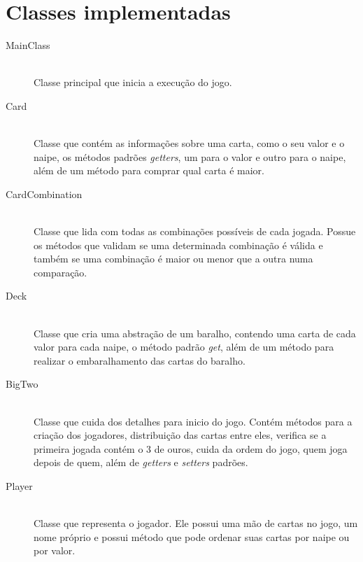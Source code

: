 \documentclass[12pt]{article}
\begin{document}
\section{Classes implementadas}
\label{classesimplementadas}
\vspace{0.4 true cm}
\begin{description}

\item[MainClass] \hfill \\
Classe principal que inicia a execução do jogo.
\vspace{0.4 true cm}

\item[Card] \hfill \\
Classe que contém as informações sobre uma carta, como o seu valor e o naipe, os métodos padrões \textit{getters}, um para o valor e outro para o naipe, além de um método para comprar qual carta é maior.
\vspace{0.4 true cm}

\item[CardCombination] \hfill \\
Classe que lida com todas as combinações possíveis de cada jogada. Possue os métodos que validam se uma determinada combinação é válida e também se uma combinação é maior ou menor que a outra numa comparação.
\vspace{0.4 true cm}

\item[Deck] \hfill \\
Classe que cria uma abstração de um baralho, contendo uma carta de cada valor para cada naipe, o método padrão \textit{get}, além de um método para realizar o embaralhamento das cartas do baralho.
\vspace{0.4 true cm}

\item[BigTwo] \hfill \\
Classe que cuida dos detalhes para inicio do jogo. Contém métodos para a criação dos jogadores, distribuição das cartas entre eles, verifica se a primeira jogada contém o 3 de ouros, cuida da ordem do jogo, quem joga depois de quem, além de \textit{getters} e \textit{setters} padrões.
\vspace{0.4 true cm}

\item[Player] \hfill \\
Classe que representa o jogador. Ele possui uma mão de cartas no jogo, um nome próprio e possui método que pode ordenar suas cartas por naipe ou por valor.
\vspace{0.4 true cm}


\end{description}
\end{document}
